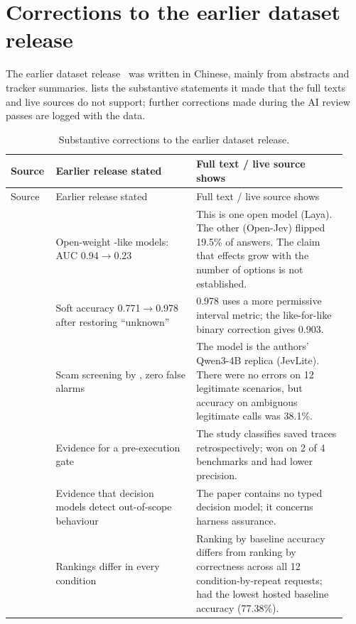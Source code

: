 \section{Corrections to the earlier dataset release}
\label{app:corrections}

The earlier dataset release~\cite{survey01} was written in Chinese, mainly from abstracts and tracker summaries.
 lists the substantive statements it made that the full texts and live sources do not support; further corrections made during the AI review passes are logged with the data.

\begingroup
\small
\renewcommand{\arraystretch}{1.2}
\begin{longtable}{@{}p{0.11\linewidth}p{0.40\linewidth}p{0.43\linewidth}@{}}
\caption{Substantive corrections to the earlier dataset release.}\label{tab:corrections}\\
\toprule
Source & Earlier release stated & Full text / live source shows \\
\midrule
\endfirsthead
\toprule
Source & Earlier release stated & Full text / live source shows \\
\midrule
\endhead
\bottomrule
\endfoot
\cite{arx26758} & Open-weight \jev{}-like models: AUC 0.94$\to$0.23 & This is one open model (Laya). The other (Open-Jev) flipped 19.5\% of answers. The claim that effects grow with the number of options is not established. \\
\cite{arx35342} & Soft accuracy 0.771$\to$0.978 after restoring ``unknown'' & 0.978 uses a more permissive interval metric; the like-for-like binary correction gives 0.903. \\
\cite{arx23959} & Scam screening by \jev{}, zero false alarms & The model is the authors' Qwen3-4B replica (JevLite). There were no errors on 12 legitimate scenarios, but accuracy on ambiguous legitimate calls was 38.1\%. \\
\cite{arx34862} & Evidence for a pre-execution gate & The study classifies saved traces retrospectively; \jev{} won on 2 of 4 benchmarks and had lower precision. \\
\cite{arx22664} & Evidence that decision models detect out-of-scope behaviour & The paper contains no typed decision model; it concerns harness assurance. \\
\cite{arx27678} & Rankings differ in every condition & Ranking by baseline accuracy differs from ranking by correctness across all 12 condition-by-repeat requests; \jev{} had the lowest hosted baseline accuracy (77.38\%). \\

\end{longtable}
